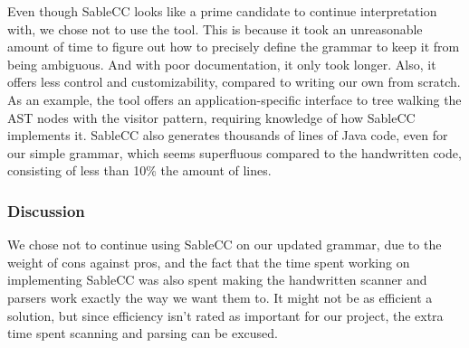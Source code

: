 Even though SableCC looks like a prime candidate to continue
interpretation with, we chose not to use the tool. This is because it
took an unreasonable amount of time to figure out how to precisely
define the grammar to keep it from being ambiguous. And with poor
documentation, it only took longer. Also, it offers less control and
customizability, compared to writing our own from scratch. As an
example, the tool offers an application-specific interface to tree
walking the AST nodes with the visitor pattern, requiring knowledge of
how SableCC implements it. SableCC also generates thousands of lines of
Java code, even for our simple grammar, which seems superfluous compared
to the handwritten code, consisting of less than 10\% the amount of
lines.

\subsubsection{Discussion}
We chose not to continue using SableCC on our updated grammar, due
to the weight of cons against pros, and the fact that the time spent
working on implementing SableCC was also spent making the handwritten
scanner and parsers work exactly the way we want them to. It might
not be as efficient a solution, but since efficiency isn't rated as
important for our project, the extra time spent scanning and parsing can
be excused.
